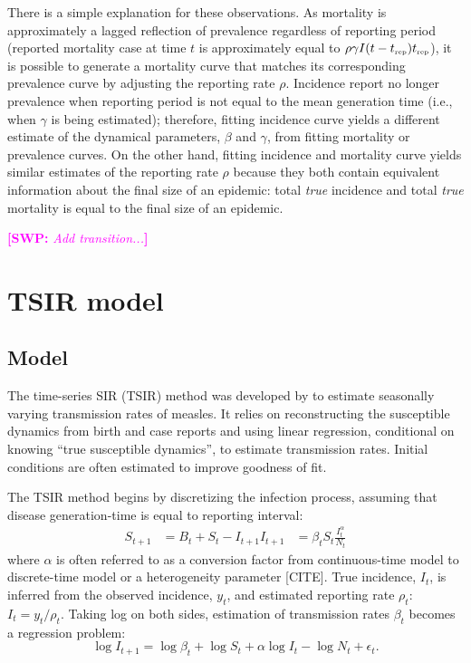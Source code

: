 \documentclass{article}
\newcommand{\comment}[3]{\textcolor{#1}{\textbf{[#2: }\textsl{#3}\textbf{]}}}
\newcommand{\swp}[1]{\comment{magenta}{SWP}{#1}}
\newcommand{\tsub}[2]{#1_{{\textrm{\tiny #2}}}}
\begin{document}
There is a simple explanation for these observations. 
As mortality is approximately a lagged reflection of prevalence regardless of reporting period (reported mortality case at time $t$ is approximately equal to $\rho \gamma I(t-\tsub{t}{rep}) \tsub{t}{rep}$), 
it is possible to generate a mortality curve that matches its corresponding prevalence curve by adjusting the reporting rate $\rho$.
Incidence report no longer  prevalence when reporting period is not equal to the mean generation time (i.e., when $\gamma$ is being estimated); therefore, fitting incidence curve yields a different estimate of the dynamical parameters, $\beta$ and $\gamma$, from fitting mortality or prevalence curves.
On the other hand, fitting incidence and mortality curve yields similar estimates of the reporting rate $\rho$ because they both contain equivalent information about the final size of an epidemic: total \emph{true} incidence and total \emph{true} mortality is equal to the final size of an epidemic.

\swp{Add transition...}

\pagebreak

\section{TSIR model}

\subsection{Model}

The time-series SIR (TSIR) method was developed by \cite{bjornstad2002dynamics} to estimate seasonally varying transmission rates of measles.
It relies on reconstructing the susceptible dynamics from birth and case reports and using linear regression, conditional on knowing ``true susceptible dynamics'', to estimate transmission rates.
Initial conditions are often estimated to improve goodness of fit.

The TSIR method begins by discretizing the infection process, assuming that disease generation-time is equal to reporting interval:
\begin{equation}
\begin{aligned}
S_{t+1} &= B_t + S_t - I_{t+1}
I_{t+1} &= \beta_t S_t \frac{I_t^\alpha}{N_t}
\end{aligned}
\end{equation}
where $\alpha$ is often referred to as a conversion factor from continuous-time model to discrete-time model or a heterogeneity parameter [CITE].
True incidence, $I_t$, is inferred from the observed incidence, $y_t$, and estimated reporting rate $\rho_t$: $I_t = y_t/\rho_t$.
Taking log on both sides, estimation of transmission rates $\beta_t$ becomes a regression problem:
\begin{equation}
\log I_{t + 1} = \log \beta_t + \log S_t + \alpha \log I_t - \log N_t + \epsilon_t.
\end{equation}
\end{document}
